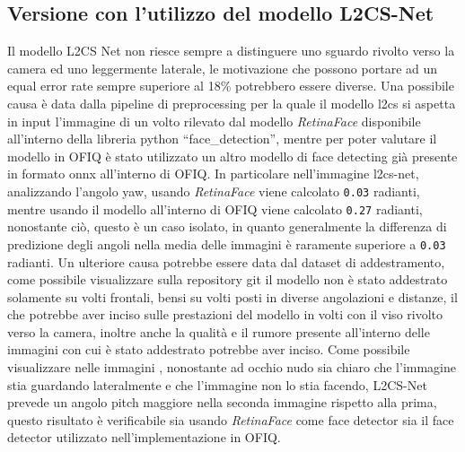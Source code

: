 \documentclass[12pt,a4paper,openright,twoside]{book}
\begin{document}
\subsection{Versione con l'utilizzo del modello L2CS-Net}
Il modello L2CS Net non riesce sempre a distinguere uno sguardo rivolto verso la camera ed uno leggermente laterale, le motivazione che possono portare ad un equal error rate sempre superiore al 18\% potrebbero essere diverse. Una possibile causa è data dalla pipeline di preprocessing per la quale il modello l2cs si aspetta in input l'immagine di un volto rilevato dal modello \textit{RetinaFace} disponibile all'interno della libreria python ``face\_detection'', mentre per poter valutare il modello in OFIQ è stato utilizzato un altro modello di face detecting già presente in formato onnx all'interno di OFIQ.
In particolare nell'immagine  l2cs-net, analizzando l'angolo yaw, usando \textit{RetinaFace} viene calcolato \texttt{0.03} radianti, mentre usando il modello all'interno di OFIQ viene calcolato \texttt{0.27} radianti, nonostante ciò, questo è un caso isolato, in quanto generalmente la differenza di predizione degli angoli nella media delle immagini è raramente superiore a \texttt{0.03} radianti.
Un ulteriore causa potrebbe essere data dal dataset di addestramento, come possibile visualizzare sulla repository git il modello non è stato addestrato solamente su volti frontali, bensi su volti posti in diverse angolazioni e distanze, il che potrebbe aver inciso sulle prestazioni del modello in volti con il viso rivolto verso la camera, inoltre anche la qualità e il rumore presente all'interno delle immagini con cui è stato addestrato potrebbe aver inciso.
Come possibile visualizzare nelle immagini , nonostante ad occhio nudo sia chiaro che l'immagine  stia guardando lateralmente e che l'immagine  non lo stia facendo, L2CS-Net prevede un angolo pitch maggiore nella seconda immagine rispetto alla prima, questo risultato è verificabile sia usando \textit{RetinaFace} come face detector sia il face detector utilizzato nell'implementazione in OFIQ.
\end{document}
